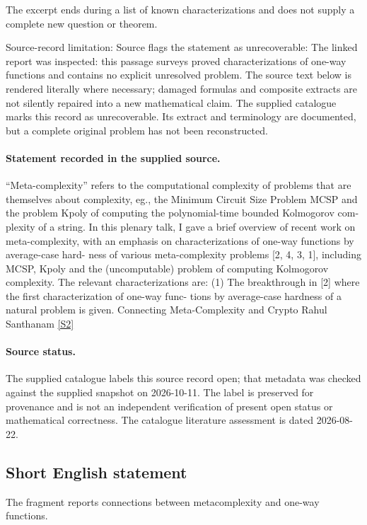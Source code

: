 \documentclass[11pt]{article}
\begin{document}
The excerpt ends during a list of known characterizations and does not supply a complete new question or theorem.

Source-record limitation: Source flags the statement as unrecoverable: The linked report was inspected: this passage surveys proved characterizations of one-way functions and contains no explicit unresolved problem.
The source text below is rendered literally where necessary; damaged formulas and composite extracts are not silently repaired into a new mathematical claim.
The supplied catalogue marks this record as unrecoverable. Its extract and terminology are documented, but a complete original problem has not been reconstructed.
\paragraph{Statement recorded in the supplied source.}
“Meta-complexity” refers to the computational complexity of problems that are themselves about complexity, eg., the Minimum Circuit Size Problem MCSP and the problem Kpoly of computing the polynomial-time bounded Kolmogorov com- plexity of a string. In this plenary talk, I gave a brief overview of recent work on meta-complexity, with an emphasis on characterizations of one-way functions by average-case hard- ness of various meta-complexity problems [2, 4, 3, 1], including MCSP, Kpoly and the (uncomputable) problem of computing Kolmogorov complexity. The relevant characterizations are: (1) The breakthrough in [2] where the first characterization of one-way func- tions by average-case hardness of a natural problem is given. Connecting Meta-Complexity and Crypto Rahul Santhanam \href{https://doi.org/10.4171/owr/2021/54}{[S2]}
\paragraph{Source status.}
The supplied catalogue labels this source record open; that metadata was checked against the supplied snapshot on 2026-10-11. The label is preserved for provenance and is not an independent verification of present open status or mathematical correctness. The catalogue literature assessment is dated 2026-08-22.
\subsection{Short English statement}
The fragment reports connections between metacomplexity and one-way functions.
\end{document}
